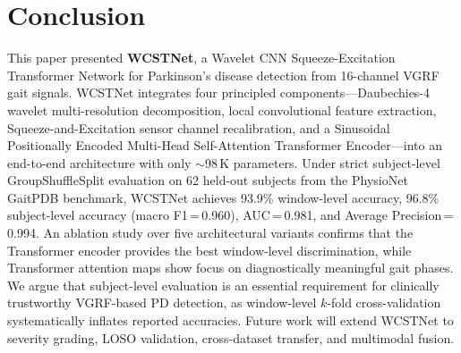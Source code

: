 \documentclass[lettersize,journal]{IEEEtran}
\begin{document}
\section{Conclusion}
\label{sec:conclusion}

This paper presented \textbf{WCSTNet}, a Wavelet CNN
Squeeze-Excitation Transformer Network for Parkinson's disease
detection from 16-channel VGRF gait signals.
WCSTNet integrates four principled components—Daubechies-4 wavelet
multi-resolution decomposition, local convolutional feature
extraction, Squeeze-and-Excitation sensor channel recalibration,
and a Sinusoidal Positionally Encoded Multi-Head Self-Attention
Transformer Encoder—into an end-to-end architecture with only
${\sim}$98\,K parameters.
Under strict subject-level GroupShuffleSplit evaluation on 62
held-out subjects from the PhysioNet GaitPDB benchmark, WCSTNet
achieves 93.9\% window-level accuracy, 96.8\% subject-level accuracy
(macro F1\,=\,0.960), AUC\,=\,0.981, and Average
Precision\,=\,0.994.
An ablation study over five architectural variants confirms that the
Transformer encoder provides the best window-level discrimination,
while Transformer attention maps show focus on diagnostically
meaningful gait phases.
We argue that subject-level evaluation is an essential requirement for
clinically trustworthy VGRF-based PD detection, as window-level
$k$-fold cross-validation systematically inflates reported accuracies.
Future work will extend WCSTNet to severity grading, LOSO validation,
cross-dataset transfer, and multimodal fusion.




\end{document}
